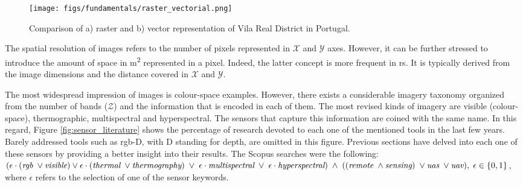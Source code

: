 \begin{figure}[ht]
	\texttt{[image: figs/fundamentals/raster\_vectorial.png]}
	\caption{Comparison of a) raster and b) vector representation of Vila Real District in Portugal.  }
    \label{fig:raster_vectorial}
\end{figure}

The spatial resolution of images refers to the number of pixels represented in $\mathcal{X}$ and $\mathcal{Y}$ axes. However, it can be further stressed to introduce the amount of space in \si{\meter^2} represented in a pixel. Indeed, the latter concept is more frequent in \acrshort{rs}. It is typically derived from the image dimensions and the distance covered in $\mathcal{X}$ and $\mathcal{Y}$.

The most widespread impression of images is colour-space examples. However, there exists a considerable imagery taxonomy organized from the number of bands ($\mathcal{Z}$) and the information that is encoded in each of them. The most revised kinds of imagery are visible (colour-space), thermographic, multispectral and hyperspectral. The sensors that capture this information are coined with the same name. In this regard, Figure \ref{fig:sensor_literature} shows the percentage of research devoted to each one of the mentioned tools in the last few years. Barely addressed tools such as \acrshort{rgb}-D, with D standing for depth, are omitted in this figure. Previous sections have delved into each one of these sensors by providing a better insight into their results. The Scopus searches were the following: $(\epsilon \cdot (\textit{rgb} \hspace{1mm} \lor \textit{visible}) \lor \epsilon \cdot (\textit{thermal} \hspace{1mm} \lor \textit{thermography}) \hspace{1mm} \lor \hspace{1mm} \epsilon \cdot \textit{multispectral} \hspace{1mm} \lor \hspace{1mm} \epsilon \cdot \textit{hyperspectral}) \hspace{1mm} \land \hspace{1mm} ((\textit{remote} \hspace{1mm} \land \textit{sensing}) \hspace{1mm} \lor \textit{uas} \hspace{1mm} \lor \textit{uav}), \hspace{1mm} \epsilon \in \{0, 1\}$, where $\epsilon$ refers to the selection of one of the sensor keywords. 

